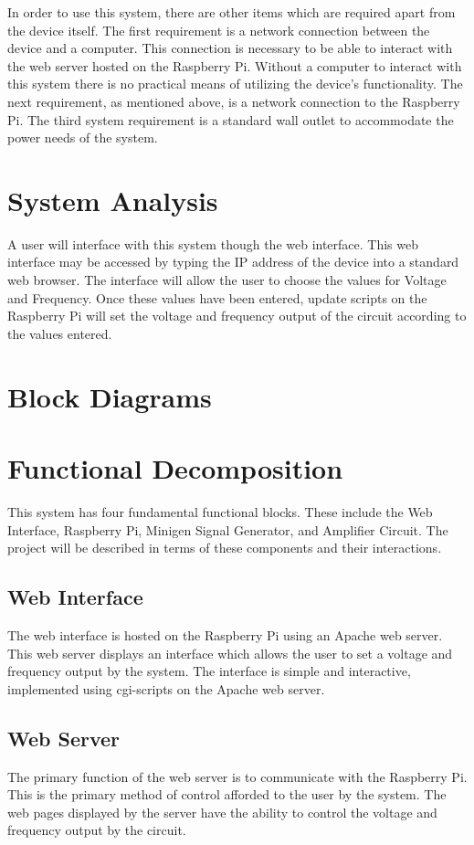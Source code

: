 \documentclass{article}	%
\begin{document}
\begin{multicols}{2}
In order to use this system,
there are other items which are required
apart from the device itself. 
The first requirement is a network connection between the device and a computer.
This connection is necessary to be able to interact with the web server hosted on the Raspberry Pi. 
Without a computer to interact with this system there is no practical means of utilizing the device's functionality. 
The next requirement, as mentioned above, is a network connection to the Raspberry Pi. 
The third system requirement is a standard wall outlet
to accommodate the power needs of the system. 

\section{System Analysis}
A user will interface with this system though the web interface.
This web interface may be accessed by
typing the IP address of the device into a standard web browser.
The interface will allow the user to choose the values for Voltage and Frequency.
Once these values have been entered,
update scripts on the Raspberry Pi
will set the voltage and frequency output of the circuit
according to the values entered.

\section{Block Diagrams}

\section{Functional Decomposition}
This system has four fundamental functional blocks.
These include the 
Web Interface, 
Raspberry Pi, 
Minigen Signal Generator, and
Amplifier Circuit.
The project will be described in terms of 
these components and
their interactions.

\subsection{Web Interface}
The web interface is hosted on the Raspberry Pi using an Apache web server.
This web server displays an interface which allows the user to
set a voltage and frequency output by the system. 
The interface is simple and interactive,
implemented using cgi-scripts on the Apache web server.

\subsection{Web Server}
The primary function of the web server is to communicate with the Raspberry Pi.
This is the primary method of control afforded 
to the user by the system. 
The web pages displayed by the server
have the ability to control the voltage and frequency output by the circuit.


\end{multicols}
\end{document}
